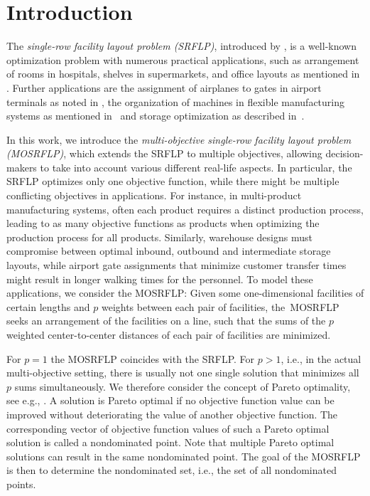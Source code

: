 \documentclass{article}
\newcommand{\SRFLP}{SRFLP\xspace}
\newcommand{\MOSRFLP}{MOSRFLP\xspace}
\begin{document}
\section{Introduction}\label{sec:Introduction}
The \emph{single-row facility layout problem (\SRFLP)}, introduced by \citet{SIMMONS1969}, is a well-known optimization problem with numerous practical applications, such as arrangement of rooms in hospitals, shelves in supermarkets, and office layouts as mentioned in \citet{SIMMONS1969}. Further applications are the assignment of airplanes to gates in airport terminals as noted in \citet{SURYANARAYANAN1991}, the organization of machines in flexible manufacturing systems as mentioned in~\citet{Heragu1988} and storage optimization as described in~\citet{Picard1981}.

In this work, we introduce the \emph{multi-objective single-row facility layout problem (\MOSRFLP)}, which extends the \SRFLP to multiple objectives, allowing decision-makers to take into account various different real-life aspects. In particular, the \SRFLP optimizes only one objective function, while there might be multiple conflicting objectives in applications. For instance, in multi-product manufacturing systems, often each product requires a distinct production process, leading to as many objective functions as products when optimizing the production process for all products. Similarly, warehouse designs must compromise between optimal inbound, outbound and intermediate storage layouts, while airport gate assignments that minimize customer transfer times might result in longer walking times for the personnel. To model these applications, we consider the \MOSRFLP: Given some one-dimensional facilities of certain lengths and $p$ weights between each pair of facilities, the~\MOSRFLP seeks an arrangement of the facilities on a line, such that the sums of the $p$ weighted center-to-center distances of each pair of facilities are minimized.

For $p=1$ the \MOSRFLP coincides with the \SRFLP.
For $p>1$, i.e., in the actual multi-objective setting, there is usually not one single solution that minimizes all $p$ sums simultaneously. We therefore consider the concept of Pareto optimality, see e.g., \citet{Ehrgott2005}. A solution is Pareto optimal if no objective function value can be improved without deteriorating the value of another objective function. The corresponding vector of objective function values of such a Pareto optimal solution is called a nondominated point. Note that multiple Pareto optimal solutions can result in the same nondominated point.
The goal of the \MOSRFLP is then to determine the nondominated set, i.e., the set of all nondominated points. 
\end{document}
